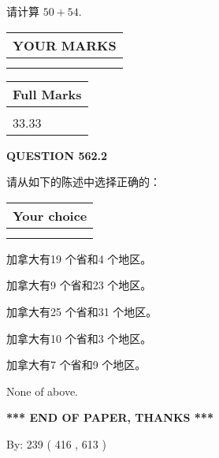 \documentclass{ctexart}
\begin{document}
  
 
请计算 $ %
50 +  %
54 $.
 

 

 
  
\vspace{0.2in}
  
\noindent\begin{tabular}{|l|}
\hline
 YOUR MARKS  \\
\hline
 \\ 
 \\ 
\hline
\end{tabular}
\hspace{0.05in} \begin{tabular}{|l|}
\hline
 Full Marks  \\
\hline
 \\ 
33.33 \\
\hline
\end{tabular}
{\textbf{\Large{QUESTION
562.2 
}}}
  
  
请从如下的陈述中选择正确的：
  
  
\noindent\hspace{3.0in} \begin{tabular}{|l|}
\hline
Your choice \\
\hline
 \\ 
 \\ 
\hline
\end{tabular}
  
  
 
 
加拿大有19 个省和4 个地区。
 
 
加拿大有9 个省和23 个地区。
 
 
加拿大有25 个省和31 个地区。
 
 
加拿大有10 个省和3 个地区。
 
 
加拿大有7 个省和9 个地区。
 
 
 None of above.
 
 
   
   
 \vspace{0.2in}
 
   
   
   
   
\vspace{1.0in} 
{\textbf{\large{ *** END OF PAPER, THANKS *** }}} 
   
   
\hspace{1.0in} By: 
 239 ( 416 ,  613 )
   
\end{document}
